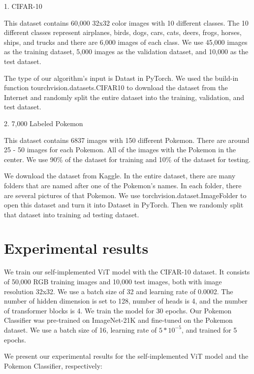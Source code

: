 \documentclass{article} %
\begin{document}
1. CIFAR-10

This dataset contains 60,000 32x32 color images with 10 different classes. The 10 different 
classes represent airplanes, birds, dogs, cars, cats, deers, frogs, horses, ships, and trucks 
and there are 6,000 images of each class. We use 45,000 images as the training dataset, 
5,000 images as the validation dataset, and 10,000 as the test dataset.

The type of our algorithm's input is Datast in PyTorch. We used the build-in function 
tourchvision.datasets.CIFAR10 to download the dataset from the Internet and randomly split 
the entire dataset into the training, validation, and test dataset. 

2. 7,000 Labeled Pokemon

This dataset contains 6837 images with 150 different Pokemon. There are around 25 - 50 
images for each Pokemon. All of the images with the Pokemon in the center. We use 90\% of 
the dataset for training and 10\% of the dataset for testing.

We download the dataset from Kaggle. In the entire dataset, there are many folders that 
are named after one of the Pokemon's names. In each folder, there are several pictures 
of that Pokemon. We use torchvision.dataset.ImageFolder to open this dataset and turn it 
into Dataset in PyTorch. Then we randomly split that dataset into training ad testing 
dataset.


\section{Experimental results}
\label{headings}
We train our self-implemented ViT model with the CIFAR-10 dataset. It consists of 50,000 RGB training images
and 10,000 test images, both with image resolution 32x32. We use a batch size of 32 and learning rate of 0.0002. The number of 
hidden dimension is set to 128, number of heads is 4, and the number of transformer blocks is 4. We train the model for 30 
epochs. Our Pokemon Classifier was pre-trained on ImageNet-21K and fine-tuned on the Pokemon dataset. We use a 
batch size of 16, learning rate of $5 * 10^{-5}$, and trained for 5 epochs.

We present our experimental results for the self-implemented ViT model and the Pokemon Classifier, respectively:

\end{document}
